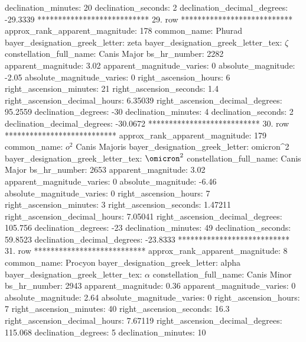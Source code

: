                declination_minutes: 20
               declination_seconds: 2
       declination_decimal_degrees: -29.3339
*************************** 29. row ***************************
    approx_rank_apparent_magnitude: 178
                       common_name: Phurad
    bayer_designation_greek_letter: zeta
bayer_designation_greek_letter_tex: $\zeta$
           constellation_full_name: Canis Major
                      bs_hr_number: 2282
                apparent_magnitude: 3.02
         apparent_magnitude_varies: 0
                absolute_magnitude: -2.05
         absolute_magnitude_varies: 0
             right_ascension_hours: 6
           right_ascension_minutes: 21
           right_ascension_seconds: 1.4
     right_ascension_decimal_hours: 6.35039
   right_ascension_decimal_degrees: 95.2559
               declination_degrees: -30
               declination_minutes: 4
               declination_seconds: 2
       declination_decimal_degrees: -30.0672
*************************** 30. row ***************************
    approx_rank_apparent_magnitude: 179
                       common_name: $o^2$ Canis Majoris
    bayer_designation_greek_letter: omicron^2
bayer_designation_greek_letter_tex: $\omicron^2$
           constellation_full_name: Canis Major
                      bs_hr_number: 2653
                apparent_magnitude: 3.02
         apparent_magnitude_varies: 0
                absolute_magnitude: -6.46
         absolute_magnitude_varies: 0
             right_ascension_hours: 7
           right_ascension_minutes: 3
           right_ascension_seconds: 1.47211
     right_ascension_decimal_hours: 7.05041
   right_ascension_decimal_degrees: 105.756
               declination_degrees: -23
               declination_minutes: 49
               declination_seconds: 59.8523
       declination_decimal_degrees: -23.8333
*************************** 31. row ***************************
    approx_rank_apparent_magnitude: 8
                       common_name: Procyon
    bayer_designation_greek_letter: alpha
bayer_designation_greek_letter_tex: $\alpha$
           constellation_full_name: Canis Minor
                      bs_hr_number: 2943
                apparent_magnitude: 0.36
         apparent_magnitude_varies: 0
                absolute_magnitude: 2.64
         absolute_magnitude_varies: 0
             right_ascension_hours: 7
           right_ascension_minutes: 40
           right_ascension_seconds: 16.3
     right_ascension_decimal_hours: 7.67119
   right_ascension_decimal_degrees: 115.068
               declination_degrees: 5
               declination_minutes: 10
